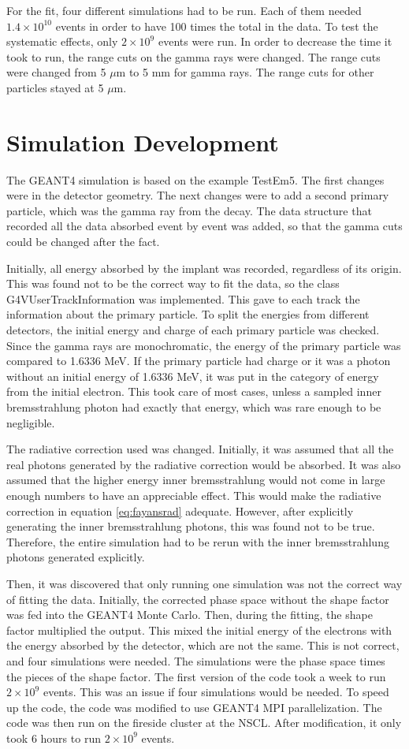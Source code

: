 \documentclass[../MaxHughesThesis.tex]{subfiles}
\begin{document}
For the fit, four different simulations had to be run.
Each of them needed $1.4 \times 10^{10}$ events in order to have 100 times the total in the data.
To test the systematic effects, only $2 \times 10^{9}$ events were run.
In order to decrease the time it took to run, the range cuts on the gamma rays were changed.
The range cuts were changed from 5 $\mu$m to 5 mm for gamma rays.
The range cuts for other particles stayed at 5 $\mu$m.

\section{Simulation Development}
The GEANT4 simulation is based on the example TestEm5.
The first changes were in the detector geometry. 
The next changes were to add a second primary particle, which was the gamma ray from the decay.
The data structure that recorded all the data absorbed event by event was added, so that the gamma cuts could be changed after the fact.

Initially, all energy absorbed by the implant was recorded, regardless of its origin.
This was found not to be the correct way to fit the data, so the class G4VUserTrackInformation was implemented.
This gave to each track the information about the primary particle.
To split the energies from different detectors, the initial energy and charge of each primary particle was checked.
Since the gamma rays are monochromatic, the energy of the primary particle was compared to 1.6336 MeV.
If the primary particle had charge or it was a photon without an initial energy of 1.6336 MeV, it was put in the category of energy from the initial electron. 
This took care of most cases, unless a sampled inner bremsstrahlung photon had exactly that energy, which was rare enough to be negligible.

The radiative correction used was changed.
Initially, it was assumed that all the real photons generated by the radiative correction would be absorbed.
It was also assumed that the higher energy inner bremsstrahlung would not come in large enough numbers to have an appreciable effect. 
This would make the radiative correction in equation \ref{eq:fayansrad} adequate. 
However, after explicitly generating the inner bremsstrahlung photons, this was found not to be true.
Therefore, the entire simulation had to be rerun with the inner bremsstrahlung photons generated explicitly.

Then, it was discovered that only running one simulation was not the correct way of fitting the data.
Initially, the corrected phase space without the shape factor was fed into the GEANT4 Monte Carlo.
Then, during the fitting, the shape factor multiplied the output. 
This mixed the initial energy of the electrons with the energy absorbed by the detector, which are not the same.
This is not correct, and four simulations were needed.
The simulations were the phase space times the pieces of the shape factor.
The first version of the code took a week to run $2 \times 10^{9}$ events.
This was an issue if four simulations would be needed.
To speed up the code, the code was modified to use GEANT4 MPI parallelization.
The code was then run on the fireside cluster at the NSCL.
After modification, it only took 6 hours to run $2 \times 10^{9}$ events.
\end{document}
